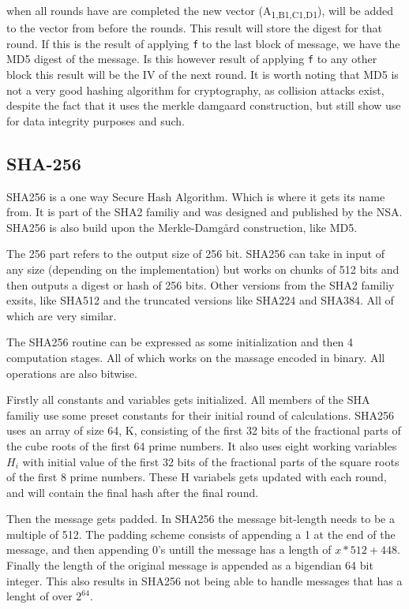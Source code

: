 \documentclass[a4paper]{article}
\begin{document}
when all rounds have are completed the new vector (A\textsubscript{1,B}\textsubscript{1,C}\textsubscript{1,D}\textsubscript{1}), will be added to the vector from before the rounds. This result will store the digest for that round. If this is the result of applying \texttt{f} to the last block of message, we have the MD5 digest of the message. Is this however result of applying \texttt{f} to any other block this result will be the IV of the next round.
It is worth noting that MD5 is not a very good hashing algorithm for cryptography, as collision attacks exist, despite the fact that it uses the merkle damgaard construction, but still show use for data integrity purposes and such.
\subsection{SHA-256}
\label{SHAalg}
SHA256 is a one way Secure Hash Algorithm. Which is where it gets its name from.
It is part of the SHA2 familiy and was designed and published by the NSA.
SHA256 is also build upon the Merkle-Damgård construction, like MD5.

The 256 part refers to the output size of 256 bit.
SHA256 can take in input of any size (depending on the implementation) but works
on chunks of 512 bits and then outputs a digest or hash of 256 bits.
Other versions from the SHA2 familiy exsits, like SHA512 and the truncated
versions like SHA224 and SHA384. All of which are very similar.

The SHA256 routine can be expressed as some initialization and then 4 computation stages.
All of which works on the massage encoded in binary. All operations are also bitwise.

Firstly all constants and variables gets initialized. All members of the SHA familiy use some preset constants for their initial round of calculations.
SHA256 uses an array of size 64, K, consisting of the first 32 bits of the fractional parts of the cube roots of the first 64 prime numbers.
It also uses eight working variables \(H_i\) with initial value of the first 32 bits of the fractional parts of the square roots of the first 8 prime numbers.
These H variabels gets updated with each round, and will contain the final hash after the final round.

Then the message gets padded. In SHA256 the message bit-length needs to be a multiple of 512.
The padding scheme consists of appending a 1 at the end of the message, and then appending 0's untill the message has a length of \(x*512+448\).
Finally the length of the original message is appended as a bigendian 64 bit integer.
This also results in SHA256 not being able to handle messages that has a lenght of over \(2^{64}\).
\end{document}
